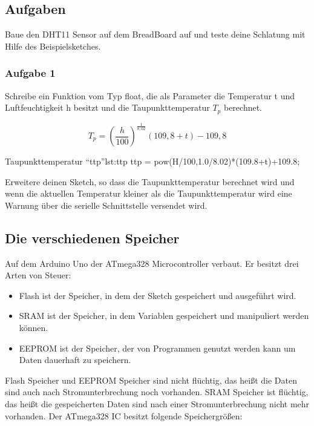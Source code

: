 \subsection{Aufgaben}

Baue den DHT11 Sensor auf dem BreadBoard auf und teste deine Schlatung mit Hilfe des Beispielsketches.

\subsubsection{Aufgabe 1}
Schreibe ein Funktion vom Typ float, die als Parameter die Temperatur t und Luftfeuchtigkeit h besitzt und die Taupunkttemperatur $T_p$ berechnet.

\begin{equation}
  T_p = \left(\frac{h}{100}\right)^\frac{1}{8,02}(109,8+t)-109,8
\end{equation}

\begin{arduinoCode}{Taupunkttemperatur ``ttp''}{lst:ttp}
ttp = pow(H/100,1.0/8.02)*(109.8+t)+109.8;
\end{arduinoCode}

Erweitere deinen Sketch, so dass die Taupunkttemperatur berechnet wird und wenn die aktuellen Temperatur kleiner als die Taupunkttemperatur wird eine Warnung über die serielle Schnittstelle versendet wird.
 

\subsection{Die verschiedenen Speicher}
Auf dem Arduino Uno der ATmega328 Microcontroller verbaut. Er besitzt drei Arten von Steuer:
\begin{itemize}
  \item Flash ist der Speicher, in dem der Sketch gespeichert und ausgeführt wird. 
  \item SRAM ist der Speicher, in dem Variablen gespeichert und manipuliert werden können.
  \item EEPROM ist der Speicher, der von Programmen genutzt werden kann um Daten dauerhaft zu speichern.
\end{itemize}


Flash Speicher und  EEPROM Speicher sind nicht flüchtig, das heißt die Daten sind auch nach Stromunterbrechung noch vorhanden. SRAM Speicher ist flüchtig, das heißt die gespeicherten Daten sind nach einer Stromunterbrechung nicht mehr vorhanden. Der ATmega328 IC besitzt folgende Speichergrößen:

